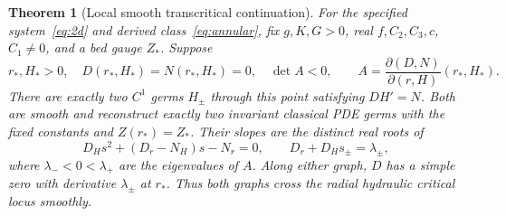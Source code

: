 \documentclass[12pt,a4paper,oneside]{report}
\numberwithin{equation}{chapter}
\newtheorem{theorem}{Theorem}[chapter]
\theoremstyle{remark}\newtheorem{remark}[theorem]{Remark}
\begin{document}
\begin{theorem}[Local smooth transcritical continuation]\label{thm:continuation}
For the specified system~\eqref{eq:2d} and derived class~\eqref{eq:annular},
fix $g,K,G>0$, real $f,C_2,C_3,c$, $C_1\ne0$, and a bed gauge $Z_*$.
Suppose
\begin{equation}\label{eq:saddle}
 r_*,H_*>0,\quad D(r_*,H_*)=N(r_*,H_*)=0,\quad
 \det A<0,\qquad A=\frac{\partial(D,N)}{\partial(r,H)}(r_*,H_*).
\end{equation}
There are exactly two $C^1$ germs $H_\pm$ through this point satisfying
$DH'=N$. Both are smooth and reconstruct exactly two invariant classical
PDE germs with the fixed constants and $Z(r_*)=Z_*$. Their slopes are the
distinct real roots of
\begin{equation}\label{eq:slope-equation}
 D_Hs^2+(D_r-N_H)s-N_r=0,
 \qquad D_r+D_Hs_\pm=\lambda_\pm,
\end{equation}
where $\lambda_-<0<\lambda_+$ are the eigenvalues of $A$.
Along either graph, $D$ has a simple zero with derivative $\lambda_\pm$ at
$r_*$. Thus both graphs cross the radial hydraulic critical locus smoothly.
\end{theorem}
\end{document}
